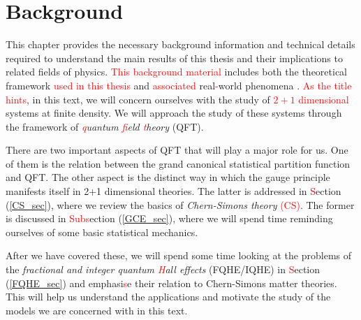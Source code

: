 
    \graphicspath{{Background_Folder/figures/PNG/}{Background_Folder/figures/PDF/}{Background_Folder/figures/}}

\chapter{Background} \label{ch:Background}
This chapter provides the necessary background information and technical details required to understand the main results of this thesis and their implications to related fields of physics. \textcolor{red}{This background material} includes both the theoretical framework \textcolor{red}{used in this thesis} and \textcolor{red}{associated} real\textcolor{red}{-}world phenomena  \colorbox{red}{ }. \textcolor{red}{As the title hints}, in this text, we will concern ourselves with the study of \textcolor{red}{$2+1$ dimensional} systems at finite density. We will approach the study of these \colorbox{red}{ }  systems through the framework of \textit{\textcolor{red}{q}uantum \textcolor{red}{f}ield \textcolor{red}{t}heory} (QFT). 

    There are two important aspects of QFT that will play a major role for us. One of them is the relation between the grand canonical statistical partition function and QFT. The other aspect is the distinct way in which the gauge principle manifests itself in 2+1 dimensional theories. The latter is addressed in \textcolor{red}{S}ection (\ref{CS_sec}), where we review the basics of \textit{Chern-Simons theory} \textcolor{red}{(CS)}. The former is discussed in \textcolor{red}{Subs}ection (\ref{GCE_sec}), where we will spend time reminding ourselves of some basic statistical mechanics. 


    After we have covered these, we will spend some time looking at the problems of the \textit{fractional and integer quantum \textcolor{red}{H}all effects} (FQHE/IQHE) in \textcolor{red}{S}ection (\ref{FQHE_sec}) and emphasi\textcolor{red}{s}e their relation to Chern-Simons matter theories. This will help us understand the applications and motivate the study of the models we are concerned with in this text.

